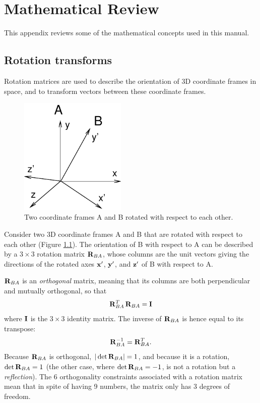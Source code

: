 
\appendix

\chapter{Mathematical Review}
\label{MathematicalReview:sec}

This appendix reviews some of the mathematical concepts used in this
manual.

\section{Rotation transforms}
\label{Rotations:sec}

Rotation matrices are used to describe the orientation of 3D
coordinate frames in space, and to transform vectors between these
coordinate frames.

\begin{figure}[t]
\begin{center}
\includegraphics[width=2in]{images/rotationAB}
\end{center}
\caption{Two coordinate frames A and B rotated with respect
to each other.}
\label{rotationAB:fig}
\end{figure}

Consider two 3D coordinate frames A and B that are rotated with
respect to each other (Figure \ref{rotationAB:fig}).  The orientation
of B with respect to A can be described by a $3 \times 3$ rotation
matrix ${\bf R}_{BA}$, whose columns are the unit vectors giving the
directions of the rotated axes ${\bf x}'$, ${\bf y}'$, and ${\bf z}'$ of B with
respect to A.

${\bf R}_{BA}$ is an {\it orthogonal} matrix, meaning that
its columns are both perpendicular and mutually
orthogonal, so that
%
\begin{equation}
{\bf R}_{BA}^T \, {\bf R}_{BA} = {\bf I}
\end{equation}
%
where ${\bf I}$ is the $3 \times 3$ identity matrix. The inverse
of ${\bf R}_{BA}$ is hence equal to its transpose:
%
\begin{equation}
{\bf R}_{BA}^{-1} = {\bf R}_{BA}^T.
\label{RABinv:eqn}
\end{equation}
%
Because ${\bf R}_{BA}$ is orthogonal, $|\det {\bf R}_{BA}| = 1$, and because it
is a rotation, $\det {\bf R}_{BA} = 1$ (the other case, where $\det {\bf R}_{BA}
= -1$, is not a rotation but a {\it reflection}).  The 6 orthogonality
constraints associated with a rotation matrix mean that in spite of
having 9 numbers, the matrix only has 3 degrees of freedom.

